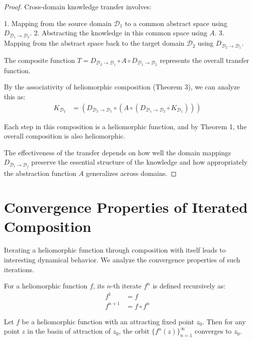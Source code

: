 \begin{proof}
Cross-domain knowledge transfer involves:

1. Mapping from the source domain $\mathcal{D}_1$ to a common abstract space using $D_{\mathcal{D}_1 \to \mathcal{D}_2}$.
2. Abstracting the knowledge in this common space using $A$.
3. Mapping from the abstract space back to the target domain $\mathcal{D}_2$ using $D_{\mathcal{D}_2 \to \mathcal{D}_1}$.

The composite function $T = D_{\mathcal{D}_2 \to \mathcal{D}_1} \circ A \circ D_{\mathcal{D}_1 \to \mathcal{D}_2}$ represents the overall transfer function.

By the associativity of heliomorphic composition (Theorem 3), we can analyze this as:
\begin{align}
K_{\mathcal{D}_2} &= (D_{\mathcal{D}_2 \to \mathcal{D}_1} \circ (A \circ (D_{\mathcal{D}_1 \to \mathcal{D}_2} \circ K_{\mathcal{D}_1})))
\end{align}

Each step in this composition is a heliomorphic function, and by Theorem 1, the overall composition is also heliomorphic.

The effectiveness of the transfer depends on how well the domain mappings $D_{\mathcal{D}_i \to \mathcal{D}_j}$ preserve the essential structure of the knowledge and how appropriately the abstraction function $A$ generalizes across domains.
\end{proof}

\section{Convergence Properties of Iterated Composition}

Iterating a heliomorphic function through composition with itself leads to interesting dynamical behavior. We analyze the convergence properties of such iterations.

\begin{definition}
For a heliomorphic function $f$, its $n$-th iterate $f^n$ is defined recursively as:
\begin{align}
f^1 &= f\\
f^{n+1} &= f \circ f^n
\end{align}
\end{definition}

\begin{theorem}
Let $f$ be a heliomorphic function with an attracting fixed point $z_0$. Then for any point $z$ in the basin of attraction of $z_0$, the orbit $\{f^n(z)\}_{n=1}^{\infty}$ converges to $z_0$.
\end{theorem}

